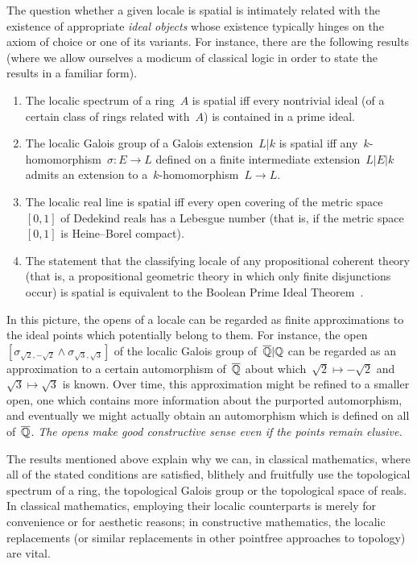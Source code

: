 \documentclass{ws-rv9x6}
\begin{document}
{The question whether a given locale is spatial is intimately related with the
existence of appropriate \emph{ideal objects} whose existence typically hinges
on the axiom of choice or one of its variants. For instance, there are the
following results (where we allow ourselves a modicum of classical logic in
order to state the results in a familiar form).
\begin{enumerate}
\item The localic spectrum of a ring~$A$ is spatial iff every nontrivial ideal
(of a certain class of rings related with~$A$) is contained in a prime ideal.
\item The localic Galois group of a Galois extension~$L|k$ is spatial iff
any~$k$-homomorphism~$\sigma : E \to L$ defined on a finite intermediate
extension~$L|E|k$ admits an extension to a~$k$-homomorphism~$L \to L$.
\item The localic real line is spatial iff every open covering of the
metric space~$[0,1]$ of Dedekind reals has a Lebesgue number (that is, if the
metric space~$[0,1]$ is Heine--Borel compact).
\item The statement that the classifying locale of any propositional coherent
theory (that is, a propositional geometric theory in which only finite
disjunctions occur) is spatial is equivalent to the Boolean Prime Ideal
Theorem~\BPIT.
\end{enumerate}

In this picture, the opens of a locale can be regarded as finite approximations
to the ideal points which potentially belong to them. For instance, the
open~$[\sigma_{\sqrt{2},-\sqrt{2}} \wedge \sigma_{\sqrt{3},\sqrt{3}}]$
of the localic Galois group of~$\overline{\mathbb{Q}}|\mathbb{Q}$ can be regarded as an
approximation to a certain automorphism of~$\overline{\mathbb{Q}}$ about
which~$\sqrt{2} \mapsto -\sqrt{2}$ and~$\sqrt{3} \mapsto \sqrt{3}$ is known. Over time, this
approximation might be refined to a smaller open, one which contains more
information about the purported automorphism, and eventually we might actually
obtain an automorphism which is defined on all of~$\overline{\mathbb{Q}}$. \emph{The opens
make good constructive sense even if the points remain elusive.}

The results mentioned above explain why we can, in classical mathematics, where all of the stated
conditions are satisfied, blithely and fruitfully use the topological
spectrum of a ring, the topological Galois group or the topological space of
reals. In classical mathematics, employing their localic counterparts is merely
for convenience or for aesthetic reasons; in constructive mathematics, the
localic replacements (or similar replacements in other pointfree approaches to
topology) are vital.

}
\end{document}
